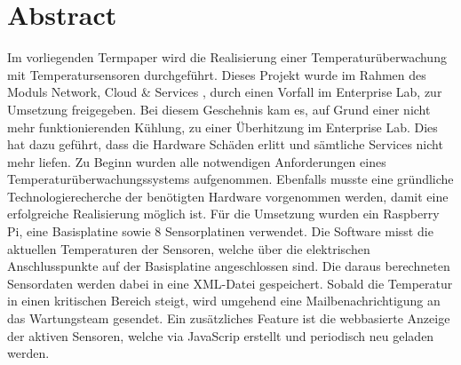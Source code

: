 \section*{Abstract}
Im vorliegenden Termpaper wird die Realisierung einer Temperaturüberwachung mit Temperatursensoren durchgeführt. Dieses Projekt  wurde im Rahmen des Moduls \grqq{}Network, Cloud \& Services\glqq{} , durch einen Vorfall im Enterprise Lab, zur Umsetzung freigegeben. Bei diesem Geschehnis kam es, auf Grund einer nicht mehr funktionierenden Kühlung, zu einer Überhitzung im Enterprise Lab. Dies hat dazu geführt, dass die Hardware Schäden erlitt und sämtliche Services nicht mehr liefen.
Zu Beginn wurden alle notwendigen Anforderungen eines Temperaturüberwachungssystems aufgenommen. Ebenfalls musste eine gründliche Technologierecherche der benötigten Hardware vorgenommen werden, damit eine erfolgreiche Realisierung möglich ist.
Für die Umsetzung wurden ein Raspberry Pi, eine Basisplatine sowie 8 Sensorplatinen verwendet. Die Software misst die aktuellen Temperaturen der Sensoren, welche über die elektrischen Anschlusspunkte auf der Basisplatine angeschlossen sind. Die daraus berechneten Sensordaten werden dabei in eine XML-Datei gespeichert. Sobald die Temperatur in einen kritischen Bereich steigt, wird umgehend eine Mailbenachrichtigung an das Wartungsteam gesendet. Ein zusätzliches Feature ist die webbasierte Anzeige der aktiven Sensoren, welche via JavaScrip erstellt und periodisch neu geladen werden.
 
\clearpage